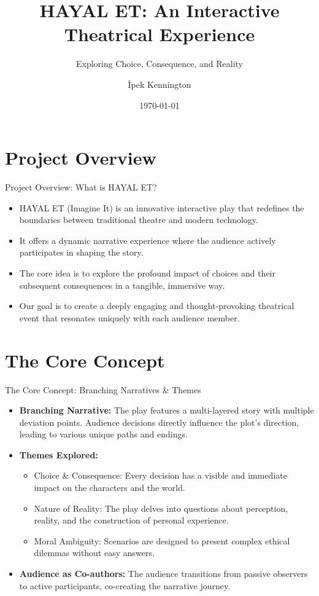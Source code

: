 \documentclass[aspectratio=169]{beamer}
\title{HAYAL ET: An Interactive Theatrical Experience}
\subtitle{Exploring Choice, Consequence, and Reality}
\author{İpek Kennington}
\date{\today}
\begin{document}
\frame{\titlepage}

\section{Project Overview}
\begin{frame}{Project Overview: What is HAYAL ET?}
    \begin{itemize}
        \item HAYAL ET (Imagine It) is an innovative interactive play that redefines the boundaries between traditional theatre and modern technology.
        \item It offers a dynamic narrative experience where the audience actively participates in shaping the story.
        \item The core idea is to explore the profound impact of choices and their subsequent consequences in a tangible, immersive way.
        \item Our goal is to create a deeply engaging and thought-provoking theatrical event that resonates uniquely with each audience member.
    \end{itemize}
\end{frame}

\section{The Core Concept}
\begin{frame}{The Core Concept: Branching Narratives \& Themes}
    \begin{itemize}
        \item \textbf{Branching Narrative:} The play features a multi-layered story with multiple deviation points. Audience decisions directly influence the plot's direction, leading to various unique paths and endings.
        \item \textbf{Themes Explored:}
        \begin{itemize}
            \item Choice \& Consequence: Every decision has a visible and immediate impact on the characters and the world.
            \item Nature of Reality: The play delves into questions about perception, reality, and the construction of personal experience.
            \item Moral Ambiguity: Scenarios are designed to present complex ethical dilemmas without easy answers.
        \end{itemize}
        \item \textbf{Audience as Co-authors:} The audience transitions from passive observers to active participants, co-creating the narrative journey.
    \end{itemize}
\end{frame}
\end{document}
